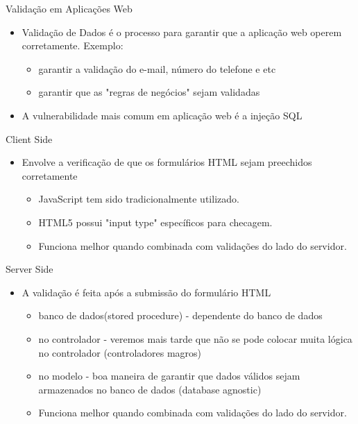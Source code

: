 \begin{frame}[t, fragile]{Validação em Aplicações Web}
	\begin{itemize}
		\item \alert{Validação de Dados} é o processo para \alert{garantir} que a aplicação web 
		operem \alert{corretamente}. Exemplo:
		\begin{itemize}
			\item garantir a validação do e-mail, número do telefone e etc
			\item garantir que as "regras de negócios" sejam validadas
		\end{itemize}

		\item A \alert{vulnerabilidade} mais comum em aplicação web é a \alert{injeção} SQL
	\end{itemize}	
\end{frame}
\begin{frame}[t, fragile]{Client Side}
	\begin{itemize}
		\item Envolve a verificação de que os formulários HTML sejam preechidos corretamente
		\begin{itemize}
			\item \alert{JavaScript} tem sido tradicionalmente utilizado.
			\item \alert{HTML5} possui "input type" específicos para checagem.
			\item Funciona melhor quando combinada com validações do lado do servidor.
		\end{itemize}
	\end{itemize}
\end{frame}
\begin{frame}[t, fragile]{Server Side}
	\begin{itemize}
		\item A validação é feita após a submissão do formulário HTML
		\begin{itemize}
			\item \alert{banco de dados}(stored procedure) - dependente do banco de dados
			\item \alert{no controlador} - veremos mais tarde que não se pode colocar muita lógica no controlador (controladores magros)
			\item \alert{no modelo} - boa maneira de garantir que dados válidos sejam armazenados
				no banco de dados (database agnostic)
			\item Funciona melhor quando combinada com validações do lado do servidor.
		\end{itemize}
	\end{itemize}	
\end{frame}
